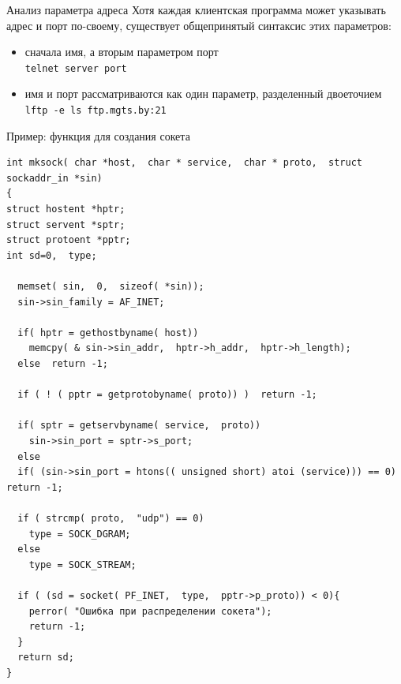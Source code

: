 \begin{frame}{Анализ параметра адреса}
Хотя каждая клиентская программа может указывать адрес и порт по-своему, существует общепринятый синтаксис этих параметров:
\begin{itemize}
	\item сначала имя, а вторым параметром порт \\
		{\tt telnet server port}
	\item имя и порт рассматриваются как один параметр, разделенный двоеточием\\
		{\tt lftp -e ls ftp.mgts.by:21}
\end{itemize}
\end{frame}

\begin{frame}[fragile]{Пример: функция для создания сокета}
\tiny
	\begin{lstlisting}
int mksock( char *host,  char * service,  char * proto,  struct sockaddr_in *sin)
{
struct hostent *hptr;
struct servent *sptr;
struct protoent *pptr;
int sd=0,  type;

  memset( sin,  0,  sizeof( *sin));
  sin->sin_family = AF_INET;

  if( hptr = gethostbyname( host))
    memcpy( & sin->sin_addr,  hptr->h_addr,  hptr->h_length);
  else	return -1;

  if ( ! ( pptr = getprotobyname( proto)) )  return -1;

  if( sptr = getservbyname( service,  proto))
    sin->sin_port = sptr->s_port;
  else 
  if( (sin->sin_port = htons(( unsigned short) atoi (service))) == 0) return -1;

  if ( strcmp( proto,  "udp") == 0)
    type = SOCK_DGRAM;
  else
    type = SOCK_STREAM;
	
  if ( (sd = socket( PF_INET,  type,  pptr->p_proto)) < 0){
    perror( "Ошибка при распределении сокета");
    return -1;
  }
  return sd;
}
\end{lstlisting}
\normalsize
\end{frame}

